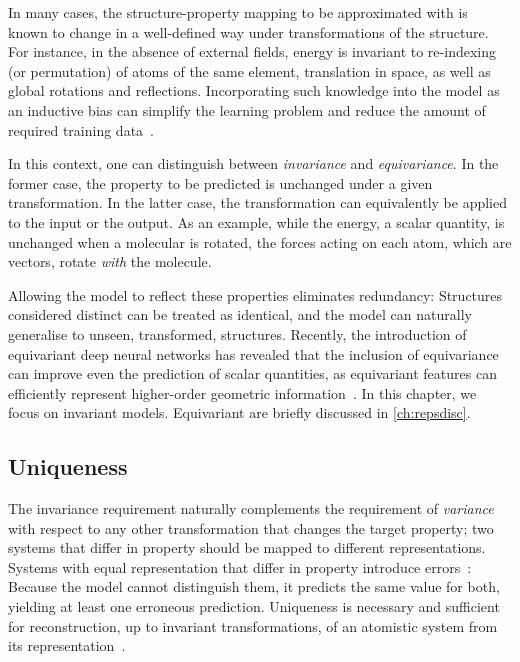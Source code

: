 In many cases, the structure-property mapping to be approximated with \ml is known to change in a well-defined way under transformations of the structure. For instance, in the absence of external fields, energy is invariant to re-indexing (or permutation) of atoms of the same element, translation in space, as well as global rotations and reflections. Incorporating such knowledge into the \ml model as an inductive bias can simplify the learning problem and reduce the amount of required training data~\cite{gsd2017q,gwcc2018q,cwc2018q,d2020Aq,ahk2019q,klt2018q,tskr2018q,htak2019q}.

In this context, one can distinguish between \emph{invariance} and \emph{equivariance}. 
In the former case, the property to be predicted is unchanged under a given transformation. In the latter case, the transformation can equivalently be applied to the input or the output. As an example, while the energy, a scalar quantity, is unchanged when a molecular is rotated, the forces acting on each atom, which are vectors, rotate \emph{with} the molecule.

Allowing the model to reflect these properties eliminates redundancy: Structures considered distinct can be treated as identical, and the model can naturally generalise to unseen, transformed, structures.
Recently, the introduction of equivariant deep neural networks has revealed that the inclusion of equivariance can improve even the prediction of scalar quantities, as equivariant features can efficiently represent higher-order geometric information~\cite{bmsk2022q}.
In this chapter, we focus on invariant models. Equivariant \nns are briefly discussed in \cref{ch:repsdisc}.

\subsection{Uniqueness}

The invariance requirement naturally complements the requirement of \emph{variance} with respect to any other transformation that changes the target property; two systems that differ in property should be mapped to different representations.
Systems with equal representation that differ in property introduce errors~\cite{m2012Aq,lrrk2015q,pwcc2020q}: Because the \ml model cannot distinguish them, it predicts the same value for both, yielding at least one erroneous prediction.
Uniqueness is necessary and sufficient for reconstruction, up to invariant transformations, of an atomistic system from its representation~\cite{bkc2013q,kme2020q}.

